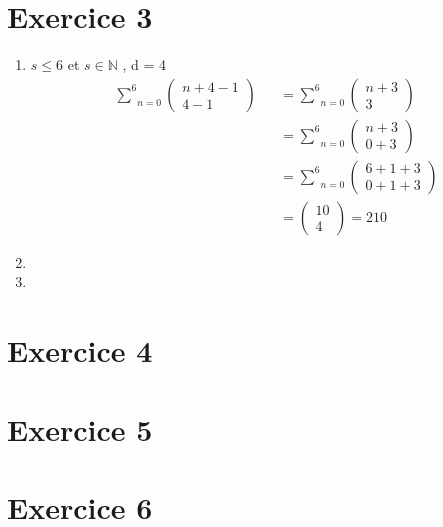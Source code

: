 \documentclass[fontsize=10pt]{article}
\begin{document}
\section*{Exercice 3}
\begin{enumerate}
\item $s \leq 6 $ et $s \in \mathbb{N}$ \hspace{0.5cm}, \hspace{0.5cm} d = 4
\begin{align*}
&\underset{n=0}{\overset{6}{\sum}}\begin{pmatrix}
n + 4 -1\\
4-1
\end{pmatrix} &&=
\underset{n=0}{\overset{6}{\sum}}\begin{pmatrix}
n + 3\\
3
\end{pmatrix}\\
&&&=
\underset{n=0}{\overset{6}{\sum}}\begin{pmatrix}
n + 3\\
0+3
\end{pmatrix}\\
&&&=\underset{n=0}{\overset{6}{\sum}}\begin{pmatrix}
6+1+3\\
0+1+3
\end{pmatrix}\\&&&= \begin{pmatrix} 10 \\ 4\end{pmatrix} = 210
\end{align*}
\item
\item
\end{enumerate}
\section*{Exercice 4}
\section*{Exercice 5}
\section*{Exercice 6}
\end{document}
